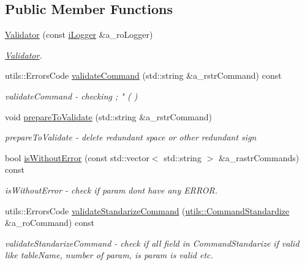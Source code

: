 \subsection*{Public Member Functions}
\begin{DoxyCompactItemize}
\item 
\mbox{\hyperlink{classhelper_1_1_validator_aa3ab86f79a0bf6c523bd5379661d58f6}{Validator}} (const \mbox{\hyperlink{classi_logger}{i\+Logger}} \&a\+\_\+ro\+Logger)
\begin{DoxyCompactList}\small\item\em \mbox{\hyperlink{classhelper_1_1_validator}{Validator}}. \end{DoxyCompactList}\item 
utils\+::\+Errors\+Code \mbox{\hyperlink{classhelper_1_1_validator_aae6518da92c0aa1a982fc3a55ad520fa}{validate\+Command}} (std\+::string \&a\+\_\+rstr\+Command) const
\begin{DoxyCompactList}\small\item\em validate\+Command -\/ checking ; " ( ) \end{DoxyCompactList}\item 
void \mbox{\hyperlink{classhelper_1_1_validator_a29502b3d7fcb861a37428adc53e4808d}{prepare\+To\+Validate}} (std\+::string \&a\+\_\+rstr\+Command)
\begin{DoxyCompactList}\small\item\em prepare\+To\+Validate -\/ delete redundant space or other redundant sign \end{DoxyCompactList}\item 
bool \mbox{\hyperlink{classhelper_1_1_validator_a0d353649adaa559a8de7ad3f9ad56881}{is\+Without\+Error}} (const std\+::vector$<$ std\+::string $>$ \&a\+\_\+rastr\+Commands) const
\begin{DoxyCompactList}\small\item\em is\+Without\+Error -\/ check if param dont have any E\+R\+R\+OR. \end{DoxyCompactList}\item 
utils\+::\+Errors\+Code \mbox{\hyperlink{classhelper_1_1_validator_a1a1f708a239f9bcec685cee12fa5eb6d}{validate\+Standarize\+Command}} (\mbox{\hyperlink{structutils_1_1_command_standardize}{utils\+::\+Command\+Standardize}} \&a\+\_\+ro\+Command) const
\begin{DoxyCompactList}\small\item\em validate\+Standarize\+Command -\/ check if all field in Command\+Standarize if valid like table\+Name, number of param, is param is valid etc. \end{DoxyCompactList}\item 

\end{DoxyCompactItemize}
